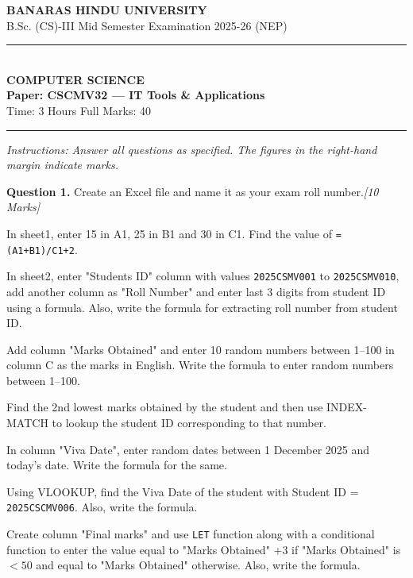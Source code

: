\documentclass[11pt,a4paper]{article}
\newcommand{\pts}[1]{\hfill\textit{[#1]}}
\begin{document}
\begin{center}
  {\large\bfseries BANARAS HINDU UNIVERSITY}\\[2pt]
  {\normalsize B.Sc. (CS)-III Mid Semester Examination 2025-26 (NEP)}\\[6pt]
  \rule{0.8\linewidth}{0.5pt}\\[6pt]
  {\large\bfseries COMPUTER SCIENCE}\\[4pt]
  {\large\bfseries Paper: CSCMV32 --- IT Tools \& Applications}\\[4pt]
  {\normalsize Time: 3 Hours \hfill Full Marks: 40}
\end{center}
\rule{\linewidth}{0.4pt}
\smallskip
\noindent\textit{Instructions: Answer all questions as specified. The figures in the right-hand margin indicate marks.}
\bigskip

\noindent\textbf{Question 1.} Create an Excel file and name it as your exam roll number.\pts{10 Marks}
\begin{parts}
  \item In sheet1, enter 15 in A1, 25 in B1 and 30 in C1. Find the value of \texttt{=(A1+B1)/C1+2}.
  \item In sheet2, enter "Students ID" column with values \texttt{2025CSMV001} to \texttt{2025CSMV010}, add another column as "Roll Number" and enter last 3 digits from student ID using a formula. Also, write the formula for extracting roll number from student ID.
  \item Add column "Marks Obtained" and enter 10 random numbers between 1--100 in column C as the marks in English. Write the formula to enter random numbers between 1--100.
  \item Find the 2nd lowest marks obtained by the student and then use INDEX-MATCH to lookup the student ID corresponding to that number.
  \item In column "Viva Date", enter random dates between 1 December 2025 and today's date. Write the formula for the same.
  \item Using VLOOKUP, find the Viva Date of the student with Student ID = \texttt{2025CSCMV006}. Also, write the formula.
  \item Create column "Final marks" and use \texttt{LET} function along with a conditional function to enter the value equal to "Marks Obtained" $+ 3$ if "Marks Obtained" is $< 50$ and equal to "Marks Obtained" otherwise. Also, write the formula.
\end{parts}
\end{document}
